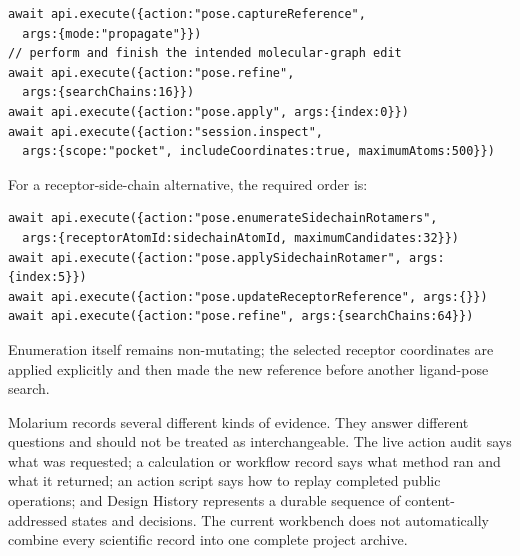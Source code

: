 \documentclass[11pt]{article}
\begin{document}
\begin{lstlisting}
await api.execute({action:"pose.captureReference",
  args:{mode:"propagate"}})
// perform and finish the intended molecular-graph edit
await api.execute({action:"pose.refine",
  args:{searchChains:16}})
await api.execute({action:"pose.apply", args:{index:0}})
await api.execute({action:"session.inspect",
  args:{scope:"pocket", includeCoordinates:true, maximumAtoms:500}})
\end{lstlisting}

For a receptor-side-chain alternative, the required order is:

\begin{lstlisting}
await api.execute({action:"pose.enumerateSidechainRotamers",
  args:{receptorAtomId:sidechainAtomId, maximumCandidates:32}})
await api.execute({action:"pose.applySidechainRotamer", args:{index:5}})
await api.execute({action:"pose.updateReceptorReference", args:{}})
await api.execute({action:"pose.refine", args:{searchChains:64}})
\end{lstlisting}

Enumeration itself remains non-mutating; the selected receptor coordinates are applied explicitly and then made the new reference before another ligand-pose search.


Molarium records several different kinds of evidence. They answer different questions and should not be treated as interchangeable. The live action audit says what was requested; a calculation or workflow record says what method ran and what it returned; an action script says how to replay completed public operations; and Design History represents a durable sequence of content-addressed states and decisions. The current workbench does not automatically combine every scientific record into one complete project archive.
\end{document}

